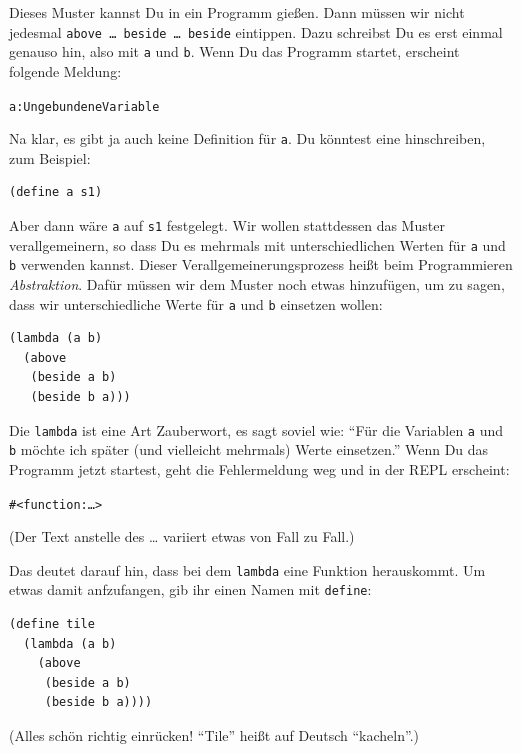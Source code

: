 Dieses Muster kannst Du in ein Programm gießen.  Dann müssen wir nicht
jedesmal \texttt{above \ldots{} beside \ldots{} beside} eintippen.
Dazu schreibst Du es erst einmal genauso hin, also mit \texttt{a} und
\texttt{b}.  Wenn Du das Programm startet, erscheint folgende Meldung:
%
\begin{alltt}
\color{red}a: Ungebundene Variable
\end{alltt}
%
Na klar, es gibt ja auch keine Definition für \texttt{a}.  Du könntest
eine hinschreiben, zum Beispiel:
%
\begin{verbatim}
(define a s1)
\end{verbatim}
%
Aber dann wäre \texttt{a} auf \texttt{s1} festgelegt.  Wir wollen
stattdessen das Muster verallgemeinern, so dass Du es mehrmals mit
unterschiedlichen Werten für \texttt{a} und \texttt{b} verwenden
kannst.  Dieser Verallgemeinerungsprozess heißt beim Programmieren
\textit{Abstraktion}.  Dafür müssen wir dem Muster
noch etwas hinzufügen, um zu sagen, dass wir unterschiedliche Werte
für \texttt{a} und \texttt{b} einsetzen wollen:
%
\begin{verbatim}
(lambda (a b)
  (above
   (beside a b)
   (beside b a)))
\end{verbatim}
%
Die \texttt{lambda} ist eine Art Zauberwort, es sagt soviel wie: "`Für
die Variablen \texttt{a} und \texttt{b} möchte ich später (und
vielleicht mehrmals) Werte einsetzen."'  Wenn Du das Programm jetzt
startest, geht die Fehlermeldung weg und in der REPL erscheint:
%
\begin{alltt}
#<function:\ldots>
\end{alltt}
%
(Der Text anstelle des \ldots{} variiert etwas von Fall zu Fall.)

Das deutet darauf hin, dass bei dem \texttt{lambda} eine Funktion
herauskommt.  Um etwas damit anfzufangen, gib ihr einen Namen mit
\texttt{define}:
%
\begin{verbatim}
(define tile
  (lambda (a b)
    (above
     (beside a b)
     (beside b a))))
\end{verbatim}
%
(Alles schön richtig einrücken! "`Tile"' heißt auf Deutsch
"`kacheln"'.)

